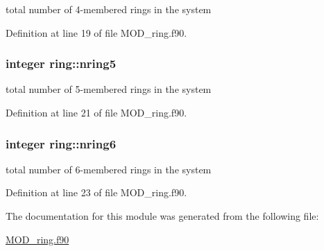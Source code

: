 total number of 4-\/membered rings in the system 



Definition at line 19 of file M\-O\-D\-\_\-ring.\-f90.

\hypertarget{classring_a5213f15f702844db955daefe99e2602d}{
\subsubsection[{nring5}]{\setlength{\rightskip}{0pt plus 5cm}integer ring\-::nring5}}\label{classring_a5213f15f702844db955daefe99e2602d}


total number of 5-\/membered rings in the system 



Definition at line 21 of file M\-O\-D\-\_\-ring.\-f90.

\hypertarget{classring_a54b1461c8d62894bf1c2cdf1aa138457}{
\subsubsection[{nring6}]{\setlength{\rightskip}{0pt plus 5cm}integer ring\-::nring6}}\label{classring_a54b1461c8d62894bf1c2cdf1aa138457}


total number of 6-\/membered rings in the system 



Definition at line 23 of file M\-O\-D\-\_\-ring.\-f90.



The documentation for this module was generated from the following file\-:\begin{DoxyCompactItemize}
\item 
\hyperlink{MOD__ring_8f90}{M\-O\-D\-\_\-ring.\-f90}\end{DoxyCompactItemize}
